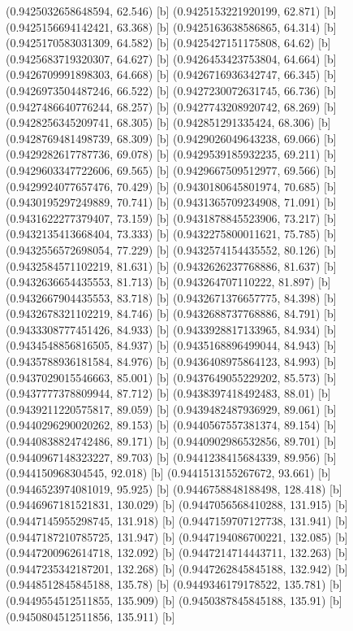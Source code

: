 {{{(0.9425032658648594, 62.546) [b] 
(0.9425153221920199, 62.871) [b] 
(0.9425156694142421, 63.368) [b] 
(0.9425163638586865, 64.314) [b] 
(0.9425170583031309, 64.582) [b] 
(0.9425427151175808, 64.62) [b] 
(0.9425683719320307, 64.627) [b] 
(0.9426453423753804, 64.664) [b] 
(0.9426709991898303, 64.668) [b] 
(0.9426716936342747, 66.345) [b] 
(0.9426973504487246, 66.522) [b] 
(0.9427230072631745, 66.736) [b] 
(0.9427486640776244, 68.257) [b] 
(0.9427743208920742, 68.269) [b] 
(0.9428256345209741, 68.305) [b] 
(0.942851291335424, 68.306) [b] 
(0.9428769481498739, 68.309) [b] 
(0.9429026049643238, 69.066) [b] 
(0.9429282617787736, 69.078) [b] 
(0.9429539185932235, 69.211) [b] 
(0.9429603347722606, 69.565) [b] 
(0.9429667509512977, 69.566) [b] 
(0.9429924077657476, 70.429) [b] 
(0.9430180645801974, 70.685) [b] 
(0.9430195297249889, 70.741) [b] 
(0.9431365709234908, 71.091) [b] 
(0.9431622277379407, 73.159) [b] 
(0.9431878845523906, 73.217) [b] 
(0.9432135413668404, 73.333) [b] 
(0.9432275800011621, 75.785) [b] 
(0.9432556572698054, 77.229) [b] 
(0.9432574154435552, 80.126) [b] 
(0.9432584571102219, 81.631) [b] 
(0.9432626237768886, 81.637) [b] 
(0.9432636654435553, 81.713) [b] 
(0.943264707110222, 81.897) [b] 
(0.9432667904435553, 83.718) [b] 
(0.9432671376657775, 84.398) [b] 
(0.9432678321102219, 84.746) [b] 
(0.9432688737768886, 84.791) [b] 
(0.9433308777451426, 84.933) [b] 
(0.9433928817133965, 84.934) [b] 
(0.9434548856816505, 84.937) [b] 
(0.9435168896499044, 84.943) [b] 
(0.9435788936181584, 84.976) [b] 
(0.9436408975864123, 84.993) [b] 
(0.9437029015546663, 85.001) [b] 
(0.9437649055229202, 85.573) [b] 
(0.9437777378809944, 87.712) [b] 
(0.9438397418492483, 88.01) [b] 
(0.9439211220575817, 89.059) [b] 
(0.9439482487936929, 89.061) [b] 
(0.9440296290020262, 89.153) [b] 
(0.9440567557381374, 89.154) [b] 
(0.9440838824742486, 89.171) [b] 
(0.9440902986532856, 89.701) [b] 
(0.9440967148323227, 89.703) [b] 
(0.9441238415684339, 89.956) [b] 
(0.944150968304545, 92.018) [b] 
(0.9441513155267672, 93.661) [b] 
(0.9446523974081019, 95.925) [b] 
(0.9446758848188498, 128.418) [b] 
(0.9446967181521831, 130.029) [b] 
(0.9447056568410288, 131.915) [b] 
(0.9447145955298745, 131.918) [b] 
(0.9447159707127738, 131.941) [b] 
(0.9447187210785725, 131.947) [b] 
(0.9447194086700221, 132.085) [b] 
(0.9447200962614718, 132.092) [b] 
(0.9447214714443711, 132.263) [b] 
(0.9447235342187201, 132.268) [b] 
(0.9447262845845188, 132.942) [b] 
(0.9448512845845188, 135.78) [b] 
(0.9449346179178522, 135.781) [b] 
(0.9449554512511855, 135.909) [b] 
(0.9450387845845188, 135.91) [b] 
(0.9450804512511856, 135.911) [b] 
}}}
